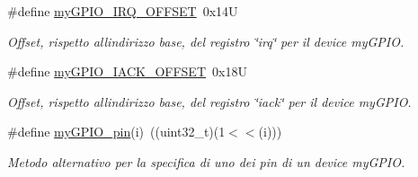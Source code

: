 \begin{DoxyCompactItemize}
\#define \hyperlink{group__bare-metal_ga31a7c2a9de5c63576f2f5aa061b936c5}{my\+G\+P\+I\+O\+\_\+\+I\+R\+Q\+\_\+\+O\+F\+F\+S\+ET}~0x14U
\begin{DoxyCompactList}\small\item\em Offset, rispetto all\textquotesingle{}indirizzo base, del registro \char`\"{}irq\char`\"{} per il device my\+G\+P\+IO. \end{DoxyCompactList}\item 
\#define \hyperlink{group__bare-metal_gadfca866ac50c2dae09c3c46ad80670fc}{my\+G\+P\+I\+O\+\_\+\+I\+A\+C\+K\+\_\+\+O\+F\+F\+S\+ET}~0x18U
\begin{DoxyCompactList}\small\item\em Offset, rispetto all\textquotesingle{}indirizzo base, del registro \char`\"{}iack\char`\"{} per il device my\+G\+P\+IO. \end{DoxyCompactList}\item 
\#define \hyperlink{group__bare-metal_gabbe2491a3b71c292521025b7b382b971}{my\+G\+P\+I\+O\+\_\+pin}(i)~((uint32\+\_\+t)(1$<$$<$(i)))
\begin{DoxyCompactList}\small\item\em Metodo alternativo per la specifica di uno dei pin di un device my\+G\+P\+IO. \end{DoxyCompactList}\end{DoxyCompactItemize}
